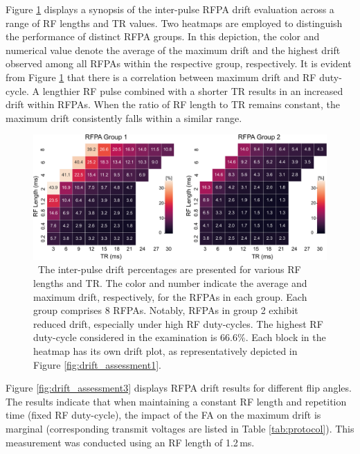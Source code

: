 Figure \ref{fig:drift_assessment2} displays a synopsis of the inter-pulse RFPA drift evaluation across a range of RF lengths and TR values. Two heatmaps are employed to distinguish the performance of distinct RFPA groups. In this depiction, the color and numerical value denote the average of the maximum drift and the highest drift observed among all RFPAs within the respective group, respectively. It is evident from Figure \ref{fig:drift_assessment2} that there is a correlation between maximum drift and RF duty-cycle. A lengthier RF pulse combined with a shorter TR results in an increased drift within RFPAs. When the ratio of RF length to TR remains constant, the maximum drift consistently falls within a similar range.

\begin{figure}[t]
    \centering
    \includegraphics[width=\textwidth]{figures/drift_assesment_table.pdf}
    \caption{\ The inter-pulse drift percentages are presented for various RF lengths and TR. The color and number indicate the average and maximum drift, respectively, for the RFPAs in each group. Each group comprises 8 RFPAs. Notably, RFPAs in group 2 exhibit reduced drift, especially under high RF duty-cycles. The highest RF duty-cycle considered in the examination is 66.6\%. Each block in the heatmap has its own drift plot, as representatively depicted in Figure \ref{fig:drift_assessment1}. }
    \label{fig:drift_assessment2}
\end{figure}


Figure \ref{fig:drift_assessment3} displays RFPA drift results for different flip angles. The results indicate that when maintaining a constant RF length and repetition time (fixed RF duty-cycle), the impact of the FA on the maximum drift is marginal (corresponding transmit voltages are listed in Table \ref{tab:protocol}). This measurement was conducted using an RF length of 1.2\,ms.

